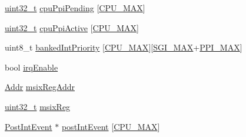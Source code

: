 \begin{DoxyCompactItemize}
\hyperlink{Type_8hh_a435d1572bf3f880d55459d9805097f62}{uint32\_\-t} \hyperlink{classPl390_a301af4f8223a97310920fc36160fb26d}{cpuPpiPending} \mbox{[}\hyperlink{classPl390_a4b102c882c8ecd5172c3f918fcde9c6d}{CPU\_\-MAX}\mbox{]}
\item 
\hyperlink{Type_8hh_a435d1572bf3f880d55459d9805097f62}{uint32\_\-t} \hyperlink{classPl390_ac682ea7abccde0f7267b5215fda1ed5c}{cpuPpiActive} \mbox{[}\hyperlink{classPl390_a4b102c882c8ecd5172c3f918fcde9c6d}{CPU\_\-MAX}\mbox{]}
\item 
uint8\_\-t \hyperlink{classPl390_a30d4209f73a9d8d2478774b12a477910}{bankedIntPriority} \mbox{[}\hyperlink{classPl390_a4b102c882c8ecd5172c3f918fcde9c6d}{CPU\_\-MAX}\mbox{]}\mbox{[}\hyperlink{classPl390_ab882d232a4976cf54e9cb73b44e1988f}{SGI\_\-MAX}+\hyperlink{classPl390_a5ff528d1355008104939d20af447bac8}{PPI\_\-MAX}\mbox{]}
\item 
bool \hyperlink{classPl390_a4dd3993efeb04a5d9c8a0820b4b09d67}{irqEnable}
\item 
\hyperlink{base_2types_8hh_af1bb03d6a4ee096394a6749f0a169232}{Addr} \hyperlink{classPl390_ae9eb70129c76fd704086093bcdd21471}{msixRegAddr}
\item 
\hyperlink{Type_8hh_a435d1572bf3f880d55459d9805097f62}{uint32\_\-t} \hyperlink{classPl390_aa646cfd25d072cc06bfb25fc3cb18890}{msixReg}
\item 
\hyperlink{classPl390_1_1PostIntEvent}{PostIntEvent} $\ast$ \hyperlink{classPl390_a22e64a003aa14067af4bb07701cb88a5}{postIntEvent} \mbox{[}\hyperlink{classPl390_a4b102c882c8ecd5172c3f918fcde9c6d}{CPU\_\-MAX}\mbox{]}
\end{DoxyCompactItemize}
